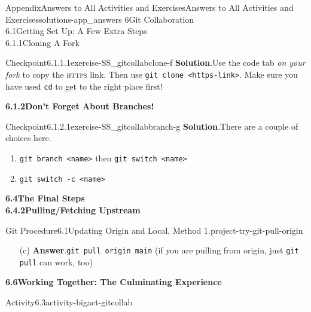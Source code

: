 \documentclass[oneside,10pt,]{book}
\newcommand{\blocktitlefont}{\relax}
\newcommand{\mono}[1]{\texttt{#1}}
\newcommand{\initialism}[1]{\textsc{\MakeLowercase{#1}}}
\begin{document}
\begin{solutions-chapter}{Appendix}{Answers to All Activities and Exercises}{}{Answers to All Activities and Exercises}{}{}{solutions-app_answers}
{6\space\textperiodcentered\space{}Git Collaboration\\
6.1\space\textperiodcentered\space{}Getting Set Up: A Few Extra Steps\\
6.1.1\space\textperiodcentered\space{}Cloning A Fork}
\begin{inlinesolution}{Checkpoint}{6.1.1.1}{}{exercise-SS_gitcollabclone-f}%
\noindent\textbf{\blocktitlefont Solution}.\hypertarget{solution-SS_gitcollabclone-f-b-back}{}\quad{}Use the code tab \emph{on your fork} to copy the \initialism{HTTPS} link. Then use \mono{git clone <https-link>}. Make sure you have used \mono{cd} to get to the right place first!%
\end{inlinesolution}%
\par\medskip
\noindent\textbf{\Large{}6.1.2\space\textperiodcentered\space{}Don't Forget About Branches!}
\begin{inlinesolution}{Checkpoint}{6.1.2.1}{}{exercise-SS_gitcollabbranch-g}%
\noindent\textbf{\blocktitlefont Solution}.\hypertarget{solution-SS_gitcollabbranch-g-b-back}{}\quad{}There are a couple of choices here.%
\begin{enumerate}
\item{}\mono{git branch <name>} then \mono{git switch <name>}%
\item{}\mono{git switch -c <name>}%
\end{enumerate}
%
\end{inlinesolution}%
\par\medskip
\noindent\textbf{\Large{}6.4\space\textperiodcentered\space{}The Final Steps\\
6.4.2\space\textperiodcentered\space{}Pulling\slash{}Fetching Upstream}
\begin{projectsolution}{Git Procedure}{6.1}{Updating Origin and Local, Method 1.}{project-try-git-pull-origin}%
\begin{enumerate}[font=\bfseries,label=(\alph*),ref=\alph*]%
\item[(c)]\noindent\textbf{\blocktitlefont Answer}.\hypertarget{answer-try-git-pull-origin-i-b-back}{}\quad{}\mono{git pull origin main} (if you are pulling from origin, just \mono{git pull} can work, too)%
\end{enumerate}%
\end{projectsolution}%
\par\medskip
\noindent\textbf{\Large{}6.6\space\textperiodcentered\space{}Working Together: The Culminating Experience}
\begin{activitysolution}{Activity}{6.3}{}{activity-bigact-gitcollab}%

\end{activitysolution}
\end{solutions-chapter}
\end{document}
